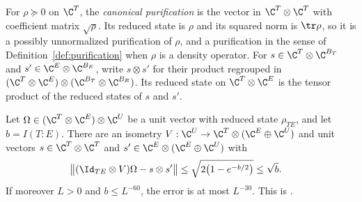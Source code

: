 \begin{definition}
    \label{def:canonical_product_purification}
    \leanok
    For $\rho\succeq0$ on $\C^T$, the \emph{canonical purification} is the
    vector in $\C^T\otimes\C^T$ with coefficient matrix $\sqrt\rho$. Its
    reduced state is $\rho$ and its squared norm is $\tr\rho$, so it is a
    possibly unnormalized purification of $\rho$, and a purification in the
    sense of Definition~\ref{def:purification} when $\rho$ is a density
    operator. For $s\in\C^T\otimes\C^{B_T}$ and
    $s'\in\C^E\otimes\C^{B_E}$, write $s\otimes s'$ for their product
    regrouped in $(\C^T\otimes\C^E)\otimes(\C^{B_T}\otimes\C^{B_E})$. Its
    reduced state on $\C^T\otimes\C^E$ is the tensor product of the reduced
    states of $s$ and $s'$.
\end{definition}

\begin{theorem}
    \label{thm:purification_splitting_mutual_information}
    \leanok
    Let $\Omega\in(\C^T\otimes\C^E)\otimes\C^U$ be a unit vector with
    reduced state $\rho_{TE}$, and let $b=I(T{:}E)$. There are an
    isometry $V:\C^U\to\C^T\otimes(\C^E\oplus\C^U)$ and unit vectors
    $s\in\C^T\otimes\C^T$ and $s'\in\C^E\otimes(\C^E\oplus\C^U)$ with
    \begin{align}
        \bigl\lVert(\Id_{TE}\otimes V)\Omega-s\otimes s'\bigr\rVert
         & \le\sqrt{2\bigl(1-e^{-b/2}\bigr)}\le\sqrt b.
        \label{eq:purification_splitting_mutual_information}
    \end{align}
    If moreover $L>0$ and $b\le L^{-60}$, the error is at most $L^{-30}$.
    This is \cite[Lemma~6.4]{OpenAI2026PolynomialPEPS}.
\end{theorem}

